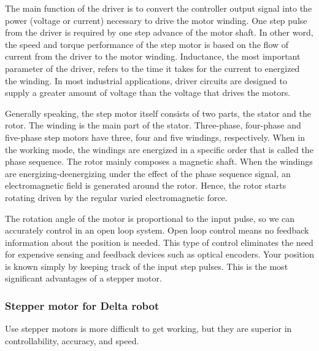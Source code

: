 The main function of the driver is to convert the controller output signal into the power (voltage or current) necessary to drive the motor winding. One step pulse from the driver is required by one step advance of the motor shaft. In other word, the speed and torque performance of the step motor is based on the flow of current from the driver to the motor winding. Inductance, the most important parameter of the driver, refers to the time it takes for the current to energized the winding. In most industrial applications, driver circuits are designed to supply a greater amount of voltage than the voltage that drives the motors.

Generally speaking, the step motor itself consists of two parts, the stator and the rotor. The winding is the main part of the stator. Three-phase, four-phase and five-phase step motors have three, four and five windings, respectively. When in the working mode, the windings are energized in a specific order that is called the phase sequence. The rotor mainly composes a magnetic shaft. When the windings are energizing-deenergizing under the effect of the phase sequence signal, an electromagnetic field is generated around the rotor. Hence, the rotor starts rotating driven by the regular varied electromagnetic force.

The rotation angle of the motor is proportional to the input pulse, so we can accurately control in an open loop system. Open loop control means no feedback information about the position is needed. This type of control eliminates the need for expensive sensing and feedback devices such as optical encoders. Your position is known simply by keeping track of the input step pulses. This is the most significant advantages of a stepper motor.
\subsubsection{Stepper motor for Delta robot}
Use stepper motors is more difficult to get working, but they are superior in controllability, accuracy, and speed.

